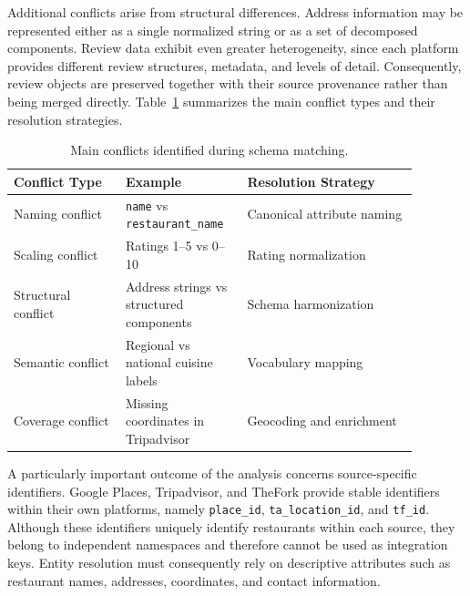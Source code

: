 Additional conflicts arise from structural differences. Address information may be represented either as a single normalized string or as a set of decomposed components. Review data exhibit even greater heterogeneity, since each platform provides different review structures, metadata, and levels of detail. Consequently, review objects are preserved together with their source provenance rather than being merged directly. Table~\ref{tab:schema-matching-conflicts} summarizes the main conflict types and their resolution strategies.

\begin{table}[t]
\centering
\footnotesize
\begin{tabular}{p{0.25\linewidth}p{0.25\linewidth}p{0.38\linewidth}}
\toprule
\textbf{Conflict Type} & \textbf{Example} & \textbf{Resolution Strategy} \\
\midrule
Naming conflict & \texttt{name} vs \texttt{restaurant\_name} & Canonical attribute naming \\
Scaling conflict & Ratings 1--5 vs 0--10 & Rating normalization \\
Structural conflict & Address strings vs structured components & Schema harmonization \\
Semantic conflict & Regional vs national cuisine labels & Vocabulary mapping \\
Coverage conflict & Missing coordinates in Tripadvisor & Geocoding and enrichment \\
\bottomrule
\end{tabular}
\caption{Main conflicts identified during schema matching.}
\label{tab:schema-matching-conflicts}
\end{table}

A particularly important outcome of the analysis concerns source-specific identifiers. Google Places, Tripadvisor, and TheFork provide stable identifiers within their own platforms, namely \texttt{place\_id}, \texttt{ta\_location\_id}, and \texttt{tf\_id}. Although these identifiers uniquely identify restaurants within each source, they belong to independent namespaces and therefore cannot be used as integration keys. Entity resolution must consequently rely on descriptive attributes such as restaurant names, addresses, coordinates, and contact information.


